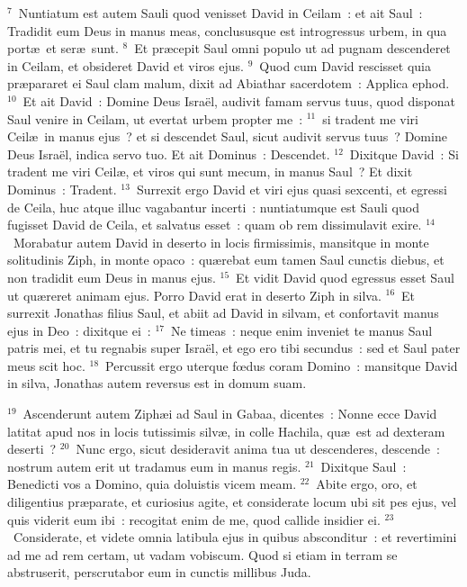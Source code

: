 ${}^{7}$~Nuntiatum est autem Sauli quod venisset David in Ceilam~: et ait Saul~: Tradidit eum Deus in manus meas, conclususque est introgressus urbem, in qua port\ae\ et ser\ae\ sunt.
${}^{8}$~Et pr\ae cepit Saul omni populo ut ad pugnam descenderet in Ceilam, et obsideret David et viros ejus.
${}^{9}$~Quod cum David rescisset quia pr\ae pararet ei Saul clam malum, dixit ad Abiathar sacerdotem~: Applica ephod.
${}^{10}$~Et ait David~: Domine Deus Isra\"el, audivit famam servus tuus, quod disponat Saul venire in Ceilam, ut evertat urbem propter me~:
${}^{11}$~si tradent me viri Ceil\ae\ in manus ejus~? et si descendet Saul, sicut audivit servus tuus~? Domine Deus Isra\"el, indica servo tuo. Et ait Dominus~: Descendet.
${}^{12}$~Dixitque David~: Si tradent me viri Ceil\ae , et viros qui sunt mecum, in manus Saul~? Et dixit Dominus~: Tradent.
${}^{13}$~Surrexit ergo David et viri ejus quasi sexcenti, et egressi de Ceila, huc atque illuc vagabantur incerti~: nuntiatumque est Sauli quod fugisset David de Ceila, et salvatus esset~: quam ob rem dissimulavit exire.
${}^{14}$~Morabatur autem David in deserto in locis firmissimis, mansitque in monte solitudinis Ziph, in monte opaco~: qu\ae rebat eum tamen Saul cunctis diebus, et non tradidit eum Deus in manus ejus.
${}^{15}$~Et vidit David quod egressus esset Saul ut qu\ae reret animam ejus. Porro David erat in deserto Ziph in silva.
${}^{16}$~Et surrexit Jonathas filius Saul, et abiit ad David in silvam, et confortavit manus ejus in Deo~: dixitque ei~:
${}^{17}$~Ne timeas~: neque enim inveniet te manus Saul patris mei, et tu regnabis super Isra\"el, et ego ero tibi secundus~: sed et Saul pater meus scit hoc.
${}^{18}$~Percussit ergo uterque fœdus coram Domino~: mansitque David in silva, Jonathas autem reversus est in domum suam.


${}^{19}$~Ascenderunt autem Ziph\ae i ad Saul in Gabaa, dicentes~: Nonne ecce David latitat apud nos in locis tutissimis silv\ae , in colle Hachila, qu\ae\ est ad dexteram deserti~?
${}^{20}$~Nunc ergo, sicut desideravit anima tua ut descenderes, descende~: nostrum autem erit ut tradamus eum in manus regis.
${}^{21}$~Dixitque Saul~: Benedicti vos a Domino, quia doluistis vicem meam.
${}^{22}$~Abite ergo, oro, et diligentius pr\ae parate, et curiosius agite, et considerate locum ubi sit pes ejus, vel quis viderit eum ibi~: recogitat enim de me, quod callide insidier ei.
${}^{23}$~Considerate, et videte omnia latibula ejus in quibus absconditur~: et revertimini ad me ad rem certam, ut vadam vobiscum. Quod si etiam in terram se abstruserit, perscrutabor eum in cunctis millibus Juda.


